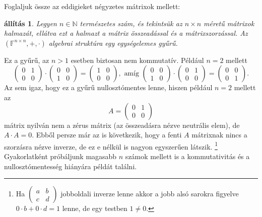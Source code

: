 \documentclass[a4paper, showtrims]{memoir}
\theoremstyle{plain}
\newtheorem{proposition}{állítás}[chapter]
\theoremstyle{remark}
\theoremstyle{definition}
\begin{document}
Foglaljuk össze az eddigieket négyzetes mátrixok mellett:
\begin{proposition}
	Legyen $n\in\mathbb{N}$ természetes szám, és tekintsük az $n\times n$ méretű mátrixok
	halmazát, ellátva ezt a halmazt a mátrix összeadással és a mátrixszorzással.
	Az $\left( \mathbb{F}^{n\times n},+,\cdot \right)$ algebrai struktúra egy egységelemes gyűrű.
\end{proposition}
Ez a gyűrű, az $n>1$ esetben biztosan nem kommutatív.
Például $n=2$ mellett
\[
	\begin{pmatrix}
		0 & 1 \\
		0 & 0
	\end{pmatrix}
	\cdot
	\begin{pmatrix}
		0 & 0 \\
		1 & 0
	\end{pmatrix}
	=
	\begin{pmatrix}
		1 & 0 \\
		0 & 0
	\end{pmatrix},
	\text{ amíg }
	\begin{pmatrix}
		0 & 0 \\
		1 & 0
	\end{pmatrix}
	\cdot
	\begin{pmatrix}
		0 & 1 \\
		0 & 0
	\end{pmatrix}
	=
	\begin{pmatrix}
		0 & 0 \\
		0 & 1
	\end{pmatrix}.
\]
Az sem igaz, hogy ez a gyűrű nullosztómentes lenne, hiszen például $n=2$ mellett az
\[
	A
	=
	\begin{pmatrix}
		0 & 1 \\
		0 & 0
	\end{pmatrix}
\]
mátrix nyilván nem a zérus mátrix (az összeadásra nézve neutrális elem),
de $A\cdot A=0$.
Ebből persze már az is következik, hogy a fenti $A$ mátrixnak nincs a szorzásra nézve inverze,
de ez e nélkül is nagyon egyszerűen látszik.%
\footnote{
	Ha
	\(
	\begin{pmatrix}
		a & b \\
		c & d
	\end{pmatrix}
	\)
	jobboldali inverze lenne akkor a jobb alsó sarokra figyelve $0\cdot b +0\cdot d=1$ lenne, de egy testben $1\neq 0$.
}
Gyakorlatként próbáljunk magasabb $n$ számok mellett is a kommutativitás és a nullosztómentesség hiányára
példát találni.
\end{document}
